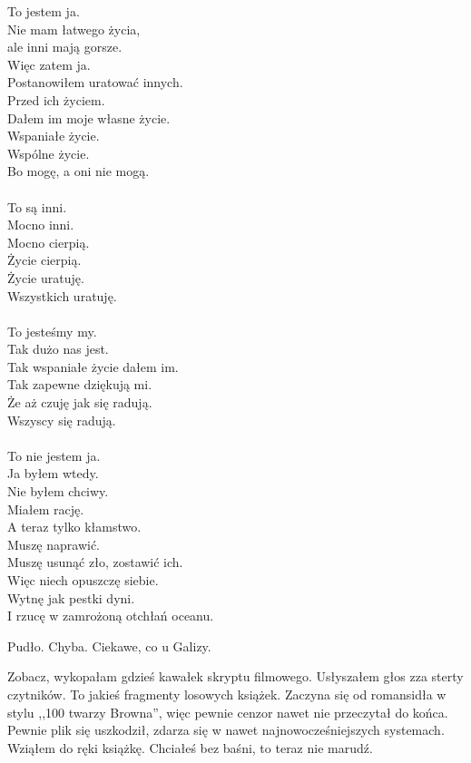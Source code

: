 \begin{poem}
	To jestem ja. \\
	Nie mam łatwego życia, \\
	ale inni mają gorsze. \\
	Więc zatem ja. \\
	Postanowiłem uratować innych. \\
	Przed ich życiem. \\
	Dałem im moje własne życie. \\
	Wspaniałe życie. \\
	Wspólne życie. \\
	Bo mogę, a oni nie mogą. \\
	\\
	To są inni. \\
	Mocno inni. \\
	Mocno cierpią. \\
	Życie cierpią. \\
	Życie uratuję. \\
	Wszystkich uratuję. \\
	\\
	To jesteśmy my. \\
	Tak dużo nas jest. \\
	Tak wspaniałe życie dałem im. \\
	Tak zapewne dziękują mi. \\
	Że aż czuję jak się radują. \\
	Wszyscy się radują. \\
	\\
	To nie jestem ja. \\
	Ja byłem wtedy. \\
	Nie byłem chciwy. \\
	Miałem rację. \\
	A teraz tylko kłamstwo. \\
	Muszę naprawić. \\
	Muszę usunąć zło, zostawić ich. \\
	Więc niech opuszczę siebie. \\
	Wytnę jak pestki dyni. \\
	I rzucę w zamrożoną otchłań oceanu.
\end{poem}

Pudło. Chyba. Ciekawe, co u Galizy.

\begin{dialogue}
	\ds{} Zobacz, wykopałam gdzieś kawałek skryptu filmowego. \dm{} Usłyszałem głos zza sterty czytników. \dm{} To jakieś fragmenty losowych książek.
	Zaczyna się od romansidła w stylu ,,100 twarzy Browna'', więc pewnie cenzor nawet nie przeczytał do końca.
	\ds{} Pewnie plik się uszkodził, zdarza się w nawet najnowocześniejszych systemach. \dm{} Wziąłem do ręki książkę.
	\ds{} Chciałeś bez baśni, to teraz nie marudź.
\end{dialogue}


